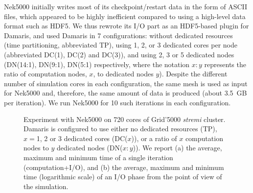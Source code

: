 Nek5000 initially writes most of its checkpoint/restart data in the form of ASCII files, 
which appeared to be highly inefficient compared to using a high-level data format such as HDF5.
We thus rewrote its I/O part as an HDF5-based plugin for Damaris, and used Damaris
in 7 configurations: without dedicated resources  (time partitioning, abbreviated TP), 
using 1, 2, or 3 dedicated cores per node (abbreviated DC(1), DC(2) and DC(3)), 
and using 2, 3 or 5 dedicated nodes (DN(14:1), DN(9:1), DN(5:1) respectively, where the notation $x:y$ represents
the ratio of computation nodes, $x$, to dedicated nodes $y$). Despite the different number of
simulation cores in each configuration, the same mesh is used as input for Nek5000 and, 
therefore, the same amount of data is produced (about 3.5~GB per iteration).
We run Nek5000 for 10 such iterations in each configuration.

\begin{figure}
	\begin{center}
	\quad
	\caption{Experiment with Nek5000 on 720 cores of Grid'5000 \emph{stremi} cluster. 
	Damaris is configured to use either no dedicated resources (TP), $x = $1, 2 or 3 dedicated cores (DC($x$)),
	or a ratio of $x$ computation nodes to $y$ dedicated nodes (DN($x:y$)). 
	We report (a) the average, maximum and minimum time of a single 
	iteration (computation+I/O), and (b) the average, maximum and minimum time (logarithmic scale) 
	of an I/O phase from the point of view of the simulation.}\label{fig:nek5dcdn1}
	\end{center}
\end{figure}

